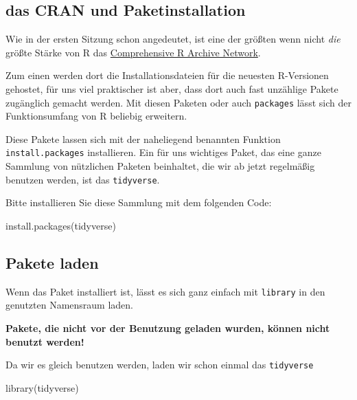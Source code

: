 \documentclass[
]{book}
\newenvironment{Shaded}{\begin{snugshade}}{\end{snugshade}}
\newcommand{\FunctionTok}[1]{\textcolor[rgb]{0.00,0.00,0.00}{#1}}
\newcommand{\NormalTok}[1]{#1}
\newcommand{\StringTok}[1]{\textcolor[rgb]{0.31,0.60,0.02}{#1}}
\begin{document}
\hypertarget{das-cran-und-paketinstallation}{%
\subsection{das CRAN und Paketinstallation}\label{das-cran-und-paketinstallation}}

Wie in der ersten Sitzung schon angedeutet, ist eine der größten wenn nicht \emph{die} größte Stärke von R das \href{https://cran.r-project.org/}{Comprehensive R Archive Network}.

Zum einen werden dort die Installationsdateien für die neuesten R-Versionen gehostet, für uns viel praktischer ist aber, dass dort auch fast unzählige Pakete zugänglich gemacht werden. Mit diesen Paketen oder auch \texttt{packages} lässt sich der Funktionsumfang von R beliebig erweitern.

Diese Pakete lassen sich mit der naheliegend benannten Funktion \texttt{install.packages} installieren. Ein für uns wichtiges Paket, das eine ganze Sammlung von nützlichen Paketen beinhaltet, die wir ab jetzt regelmäßig benutzen werden, ist das \texttt{tidyverse}.

Bitte installieren Sie diese Sammlung mit dem folgenden Code:

\begin{Shaded}
\begin{Highlighting}[]
\FunctionTok{install.packages}\NormalTok{(}\StringTok{\textquotesingle{}tidyverse\textquotesingle{}}\NormalTok{)}
\end{Highlighting}
\end{Shaded}

\hypertarget{pakete-laden}{%
\subsection{Pakete laden}\label{pakete-laden}}

Wenn das Paket installiert ist, lässt es sich ganz einfach mit \texttt{library} in den genutzten Namensraum laden.

\textbf{Pakete, die nicht vor der Benutzung geladen wurden, können nicht benutzt werden!}

Da wir es gleich benutzen werden, laden wir schon einmal das \texttt{tidyverse}

\begin{Shaded}
\begin{Highlighting}[]
\FunctionTok{library}\NormalTok{(tidyverse)}
\end{Highlighting}
\end{Shaded}
\end{document}
